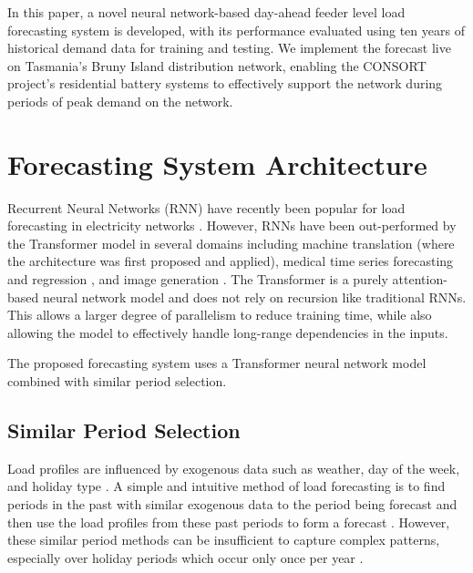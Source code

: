 \documentclass[conference]{IEEEtran}
\begin{document}
In this paper, a novel neural network-based day-ahead feeder level load forecasting system is developed, with its performance evaluated using ten years of historical demand data for training and testing. We implement the forecast live on Tasmania's Bruny Island distribution network, enabling the CONSORT project's residential battery systems to effectively support the network during periods of peak demand on the network.

\section{Forecasting System Architecture}

Recurrent Neural Networks (RNN) have recently been popular for load forecasting in electricity networks \cite{Kong2018}.
However, RNNs have been out-performed by the Transformer \cite{Vaswani2017} model in several domains including machine translation \cite{Vaswani2017} (where the architecture was first proposed and applied), medical time series forecasting and regression \cite{Song2017}, and image generation \cite{Parmar2018}.
The Transformer is a purely attention-based neural network model and does not rely on recursion like traditional RNNs.
This allows a larger degree of parallelism to reduce training time, while also allowing the model to effectively handle long-range dependencies in the inputs.

The proposed forecasting system uses a Transformer neural network model combined with similar period selection.


\subsection{Similar Period Selection} \label{simperiod}
Load profiles are influenced by exogenous data such as weather, day of the week, and holiday type \cite{Weron2006}.
A simple and intuitive method of load forecasting is to find periods in the past with similar exogenous data to the period being forecast and then use the load profiles from these past periods to form a forecast \cite{Senjyu1998}.
However, these similar period methods can be insufficient to capture complex patterns, especially over holiday periods which occur only once per year \cite{Chen2010}.

\end{document}
